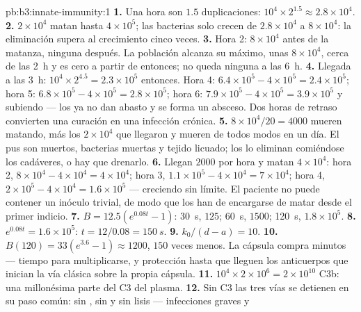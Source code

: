 \begin{solution}{pb:b3:innate-immunity:1}
\textbf{1.} Una hora son $1.5$ duplicaciones: $10^{4}\times 2^{1.5} \approx
2.8\times 10^{4}$.
\textbf{2.} $2\times 10^{4}$  matan hasta $4\times 10^{5}$;
las bacterias solo crecen de $2.8\times 10^{4}$ a $8\times 10^{4}$: la
eliminación supera al crecimiento cinco veces.
\textbf{3.} Hora 2: $8\times 10^{4}$ antes de la matanza, ninguna
después. La población alcanza su máximo, unas $8\times 10^{4}$, cerca de
las \qty{2}{h} y es cero a partir de entonces; no queda ninguna a las
\qty{6}{h}.
\textbf{4.} Llegada a las \qty{3}{h}: $10^{4}\times 2^{4.5} = 2.3\times
10^{5}$ entonces. Hora 4: $6.4\times 10^{5} - 4\times 10^{5} = 2.4\times
10^{5}$; hora 5: $6.8\times 10^{5} - 4\times 10^{5} = 2.8\times 10^{5}$;
hora 6: $7.9\times 10^{5} - 4\times 10^{5} = 3.9\times 10^{5}$ y subiendo
--- los  ya no dan abasto y se forma un absceso. Dos horas de
retraso convierten una curación en una infección crónica.
\textbf{5.} $8\times 10^{4}/20 = 4000$  mueren matando, más
los $2\times 10^{4}$ que llegaron y mueren de todos modos en un día. El
pus son  muertos, bacterias muertas y tejido licuado; los
 lo eliminan comiéndose los cadáveres, o hay que drenarlo.
\textbf{6.} Llegan $2000$ por hora y matan $4\times 10^{4}$: hora 2,
$8\times 10^{4} - 4\times 10^{4} = 4\times 10^{4}$; hora 3, $1.1\times
10^{5} - 4\times 10^{4} = 7\times 10^{4}$; hora 4, $2\times 10^{5} -
4\times 10^{4} = 1.6\times 10^{5}$ --- creciendo sin límite. El paciente
no puede contener un inóculo trivial, de modo que los  han de
encargarse de matar desde el primer indicio.
\textbf{7.} $B = 12.5(e^{0.08t} - 1)$: \qty{30}{s}, $125$; \qty{60}{s},
$1500$; \qty{120}{s}, $1.8\times 10^{5}$.
\textbf{8.} $e^{0.08t} = 1.6\times 10^{5}$: $t = 12/0.08 = \qty{150}{s}$.
\textbf{9.} $k_{0}/(d - a) = 10$.
\textbf{10.} $B(120) = 33(e^{3.6} - 1) \approx 1200$, $150$ veces menos.
La cápsula compra minutos --- tiempo para multiplicarse, y protección
hasta que lleguen los anticuerpos que inician la vía clásica sobre la
propia cápsula.
\textbf{11.} $10^{4}\times 2\times 10^{6} = 2\times 10^{10}$ C3b: una
millonésima parte del C3 del plasma.
\textbf{12.} Sin C3 las tres vías se detienen en su paso común: sin
, sin  y sin lisis --- infecciones graves y

\end{solution}
